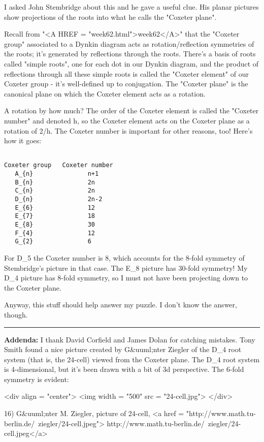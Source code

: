 I asked John Stembridge about this and he gave a useful clue.  His
planar pictures show projections of the roots into what he calls the 
"Coxeter plane".  

Recall from "<A HREF = "week62.html">week62</A>" that the "Coxeter group" associated to a Dynkin 
diagram acts as rotation/reflection symmetries of the roots; it's 
generated by reflections through the roots.  There's a basis of roots 
called "simple roots", one for each dot in our Dynkin diagram, and 
the product of reflections through all these simple roots is called 
the "Coxeter element" of our Coxeter group - it's well-defined up to 
conjugation.  The "Coxeter plane" is the canonical plane on which the
Coxeter element acts as a rotation.

A rotation by how much?  The order of the Coxeter element is called
the "Coxeter number" and denoted h, so the Coxeter element
acts on the Coxeter plane as a rotation of 2\pi /h.  The Coxeter number
is important for other reasons, too!  Here's how it goes:


\begin{verbatim}

Coxeter group   Coxeter number
   A_{n}               n+1
   B_{n}               2n
   C_{n}               2n
   D_{n}               2n-2
   E_{6}               12
   E_{7}               18 
   E_{8}               30
   F_{4}               12
   G_{2}               6
\end{verbatim}
    
For D_{5} the Coxeter number is 8, which accounts for the
8-fold symmetry of Stembridge's picture in that case.  The
E_{8} picture has 30-fold symmetry!  My D_{4} picture
has 8-fold symmetry, so I must not have been projecting down to the
Coxeter plane.

Anyway, this stuff should help answer my puzzle.  I don't know the answer,
though.


\par\noindent\rule{\textwidth}{0.4pt}
\textbf{Addenda:} I thank David Corfield and James Dolan for catching
mistakes.  Tony Smith found a nice picture created by G&uuml;nter
Ziegler of the D_{4} root system (that is, the 24-cell) 
viewed from the Coxeter plane.  The D_{4} root system is
4-dimensional, but it's been drawn with a bit of 3d perspective.  
The 6-fold symmetry is evident:

<div align = "center">
<img width = "500" src = "24-cell.jpg">
</div>

16) G&uuml;nter M. Ziegler, picture of 24-cell,
<a href = "http://www.math.tu-berlin.de/~ziegler/24-cell.jpeg">
http://www.math.tu-berlin.de/~ziegler/24-cell.jpeg</a>

